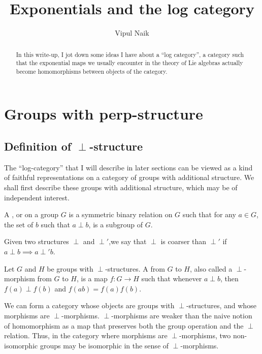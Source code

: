 \documentclass[a4paper]{amsart}
\title{Exponentials and the log category}
\author{Vipul Naik}
\begin{document}
\maketitle

\begin{abstract}
  In this write-up, I jot down some ideas I have about a ``log
  category'', a category such that the exponential maps we usually
  encounter in the theory of Lie algebras actually become
  homomorphisms between objects of the category. 
\end{abstract}

\section{Groups with perp-structure}

\subsection{Definition of  $\perp$-structure}

The ``log-category'' that I will describe in later sections can be
viewed as a kind of faithful representations on a category of groups
with additional structure. We shall first describe these groups with
additional structure, which may be of independent interest.

\begin{definer}
  A , or  on
  a group $G$ is a symmetric binary relation on $G$ such that for any
  $a \in G$, the set of $b$ such that $a \perp b$, is a subgroup of $G$.
\end{definer}

Given two structures $\perp$ and $\perp'$,we say that $\perp$ is coarser
than $\perp'$ if $a \perp b \implies a \perp' b$.

\begin{definer}
  Let $G$ and $H$ be groups with $\perp$-structures. A
   from $G$ to $H$, also called a
  $\perp$-morphism from $G$ to $H$, is a map $f: G \to H$ such that
  whenever $a \perp b$, then $f(a) \perp f(b)$ and $f(ab) = f(a)f(b)$.
\end{definer}

We can form a category whose objects are groups with
$\perp$-structures, and whose morphisms are
$\perp$-morphisms. $\perp$-morphisms are weaker than the naive notion
of homomorphism as a map that preserves both the group operation and
the $\perp$ relation. Thus, in the category where morphisms are
$\perp$-morphisms, two non-isomorphic groups may be isomorphic
in the sense of $\perp$-morphisms.
\end{document}
